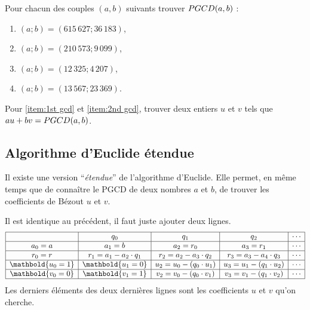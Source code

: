             \begin{exe}
                  Pour chacun des couples $(a,b)$ suivants trouver $PGCD(a,b)$ :
                  \begin{enumerate}
                        \item $(a;b) = (615\,627 ; 36\,183)$, \label{item:1st gcd}
                        \item $(a;b) = (210\,573 ; 9\,099)$, \label{item:2nd gcd}
                        \item $(a;b) = (12\,325 ; 4\,207)$,
                        \item $(a;b) = (13\,567 ; 23\,369)$.
                  \end{enumerate}
                  Pour \ref{item:1st gcd} et \ref{item:2nd gcd}, trouver deux entiers $u$ et $v$ tels que
                  $au + bv = PGCD(a,b)$.
            \end{exe}
%
		\subsection*{Algorithme d'Euclide \'etendue}
		Il existe une version ``\emph{\'etendue}'' de l'algorithme d'Euclide.
		Elle permet, en m\^eme temps que de conna\^itre le PGCD de deux nombres $a$ et $b$, 
		de trouver les coefficients de B\'ezout $u$ et $v$.
		
		Il est identique au pr\'ec\'edent, il faut juste ajouter deux lignes.
		\[
			\begin{array}{|c|c|c|c|c|}
				\hline 
					& q_0 & q_1 & q_2 & \cdots \\ 
				\hline 
					a_0 = a & a_1 = b & a_2 = r_0 & a_3 = r_1  & \cdots \\ 
				\hline 
					r_0 = r & r_1 = a_1 - a_2 \cdot q_1 & r_2 = a_2 - a_3 \cdot q_2 & r_3 = a_3 - a_4 \cdot q_3 & \cdots \\ 
				\hline
					\mathbold{u_0 = 1} & \mathbold{u_1 = 0} & u_2 = u_0 - (q_0 \cdot u_1) & u_3 = u_1 - (q_1 \cdot u_2) & \cdots\\
				\hline
					\mathbold{v_0 = 0} & \mathbold{v_1 = 1} & v_2 = v_0 - (q_0 \cdot v_1) & v_3 = v_1 - (q_1 \cdot v_2) & \cdots\\
				\hline
			\end{array} 
		\]
		Les derniers \'el\'ements des deux derni\`eres lignes sont les coefficients $u$ et $v$ qu'on cherche.
		

